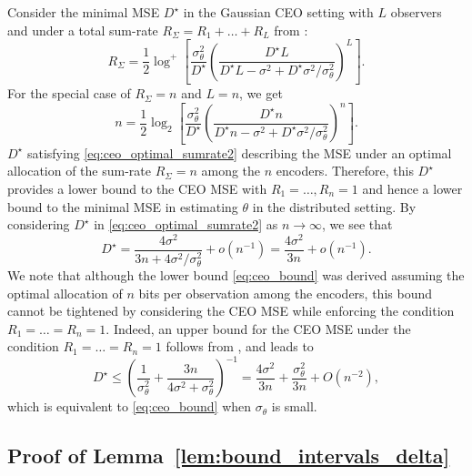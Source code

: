 \documentclass[letterpaper, 11pt]{IEEEtran}      %
\newtheorem{lem}[thm]{\bf {Lemma}}
\begin{document}
Consider the minimal MSE $D^\star$ in the Gaussian CEO setting with $L$ observers and under a total sum-rate $R_\Sigma = R_1 + \ldots +R_L$
from \cite[Eq. 10]{chen2004upper}:
\begin{equation} \label{eq:ceo_optimal_sumrate}
R_{\Sigma} = \frac{1}{2} \log^+ \left[ \frac{\sigma_\theta^2}{D^\star} \left( \frac{D^\star L}{ D^\star L - \sigma^2 + D^\star \sigma^2 / \sigma_\theta^2 }\right)^L  \right].
\end{equation}
For the special case of $R_\Sigma = n$ and $L=n$, we get
\begin{equation} \label{eq:ceo_optimal_sumrate2}
n = \frac{1}{2} \log_2 \left[ \frac{\sigma_\theta^2}{D^\star} \left(\frac{ D^\star n }{D^\star n - \sigma^2 + D^\star \sigma^2/\sigma_\theta^2 }  \right)^n  \right].
\end{equation}
$D^\star$ satisfying \eqref{eq:ceo_optimal_sumrate2} describing the MSE under an optimal allocation of the sum-rate $R_\Sigma = n$ among the $n$ encoders. Therefore, this $D^\star$ provides a lower bound to the CEO MSE with $R_1=\ldots,R_n = 1$ and hence a lower bound to the minimal MSE in estimating $\theta$ in the distributed setting. By considering $D^\star$ in \eqref{eq:ceo_optimal_sumrate2} as $n\rightarrow \infty$, we see that 
\[
D^\star = \frac{ 4\sigma^2 }{3n + 4 \sigma^2 / \sigma_\theta^2 } + o(n^{-1}) =  \frac{4\sigma^2}{3n} + o(n^{-1}). 
\]
We note that although the lower bound \eqref{eq:ceo_bound} was derived assuming the optimal allocation of $n$ bits per observation among the encoders, this bound cannot be tightened by considering the CEO MSE while enforcing the condition $R_1=\ldots = R_n = 1$. Indeed, an upper bound for the CEO MSE under the condition $R_1=\ldots = R_n = 1$ follows from \cite{KipnisRini2017}, and leads to
\[
D^\star \leq  \left( \frac{1}{\sigma_\theta^2} +  \frac{3n}{4\sigma^2 + \sigma_\theta^2} \right)^{-1}   =
\frac{4 \sigma^2}{3n} +  \frac{\sigma_\theta^2}{3n} + O(n^{-2}),
\]
which is equivalent to \eqref{eq:ceo_bound} when $\sigma_\theta$ is small. 

\subsection{Proof of Lemma~\ref{lem:bound_intervals_delta} \label{proof:lem:bound_intervals_delta}}  

\end{document}
